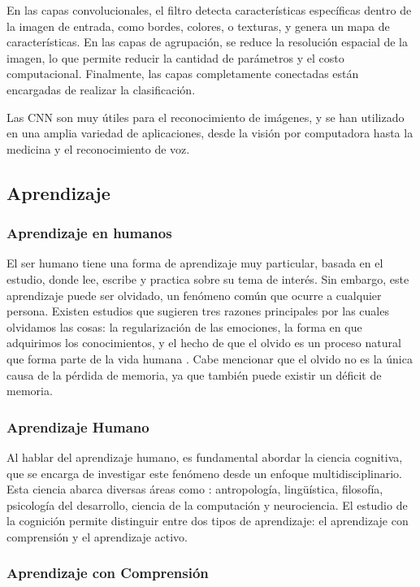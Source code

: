 En las capas convolucionales, el filtro detecta características específicas dentro de la imagen de entrada, como bordes, colores, o texturas, y genera un mapa de características. En las capas de agrupación, se reduce la resolución espacial de la imagen, lo que permite reducir la cantidad de parámetros y el costo computacional. Finalmente, las capas completamente conectadas están encargadas de realizar la clasificación.

Las CNN son muy útiles para el reconocimiento de imágenes, y se han utilizado en una amplia variedad de aplicaciones, desde la visión por computadora hasta la medicina y el reconocimiento de voz.


\subsection{Aprendizaje}

\subsubsection{Aprendizaje en humanos}

El ser humano tiene una forma de aprendizaje muy particular, basada en el estudio, donde lee, escribe y practica sobre su tema de interés. Sin embargo, este aprendizaje puede ser olvidado, un fenómeno común que ocurre a cualquier persona. Existen estudios que sugieren tres razones principales por las cuales olvidamos las cosas: la regularización de las emociones, la forma en que adquirimos los conocimientos, y el hecho de que el olvido es un proceso natural que forma parte de la vida humana \cite{Nrby2015}. Cabe mencionar que el olvido no es la única causa de la pérdida de memoria, ya que también puede existir un déficit de memoria.

\subsubsection{Aprendizaje Humano}

Al hablar del aprendizaje humano, es fundamental abordar la ciencia cognitiva, que se encarga de investigar este fenómeno desde un enfoque multidisciplinario. Esta ciencia abarca diversas áreas como \cite{bransford2000}: antropología, lingüística, filosofía, psicología del desarrollo, ciencia de la computación y neurociencia. El estudio de la cognición permite distinguir entre dos tipos de aprendizaje: el aprendizaje con comprensión y el aprendizaje activo.

\subsubsection{Aprendizaje con Comprensión}

